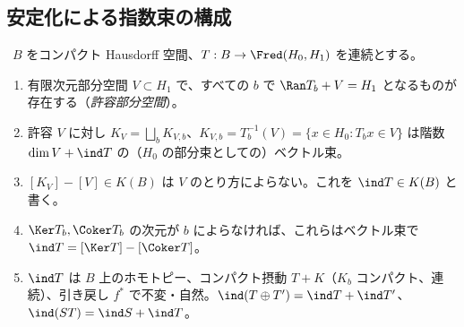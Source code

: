 \subsection{安定化による指数束の構成}
\begin{thm}[指数束]\label{thm:indexbundle}\tP\
$B$ をコンパクト Hausdorff 空間、$T:B\to\Fred(H_0,H_1)$ を連続とする。
\begin{enumerate}
\item 有限次元部分空間 $V\subset H_1$ で、すべての $b$ で $\Ran T_b+V=H_1$ となるものが存在する（\emph{許容部分空間}）。
\item 許容 $V$ に対し $K_V=\bigsqcup_bK_{V,b}$、$K_{V,b}=T_b^{-1}(V)=\{x\in H_0:T_bx\in V\}$ は階数 $\dim V+\ind T$ の（$H_0$ の部分束としての）ベクトル束。
\item $[K_V]-[V]\in K(B)$ は $V$ のとり方によらない。これを $\ind T\in K(B)$ と書く。
\item $\Ker T_b,\Coker T_b$ の次元が $b$ によらなければ、これらはベクトル束で $\ind T=[\Ker T]-[\Coker T]$。
\item $\ind T$ は $B$ 上のホモトピー、コンパクト摂動 $T+K$（$K_b$ コンパクト、連続）、引き戻し $f^*$ で不変・自然。$\ind(T\oplus T')=\ind T+\ind T'$、$\ind(ST)=\ind S+\ind T$。
\end{enumerate}
\end{thm}
